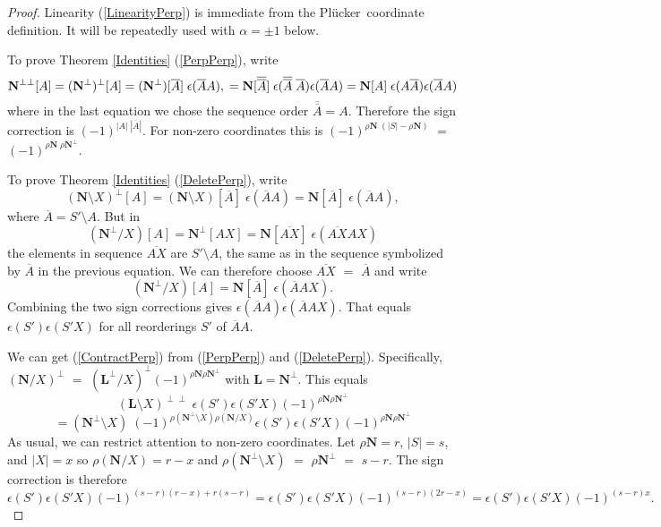 \documentclass[12pt]{article}
\theoremstyle{definition}
\newcommand{\scomp}[1]{\ensuremath{\overline{#1}}}
\newcommand{\Rank}{{\rho}}%
\newcommand{\Card}[1]{\ensuremath{{\left|#1\right|}}}
\newcommand{\ext}[1]{\ensuremath{\mathbf{#1}}}
\newcommand{\Plucker}{Pl\"{u}cker\ }
\begin{document}
\begin{proof}
Linearity (\ref{LinearityPerp}) is immediate from the \Plucker coordinate
definition.  It will be repeatedly used with $\alpha = \pm 1$ below.

To prove Theorem \ref{Identities} (\ref{PerpPerp}), write
\begin{equation*}
\ext{N}^{\perp\perp}[A] = (\ext{N}^\perp)^\perp[A] 
                  = (\ext{N}^\perp)[\scomp{A}]\;\epsilon(\scomp{A} A),\\
= \ext{N}[\scomp{\scomp{A}}]\;
\epsilon(\scomp{\scomp{A}}\;\scomp{A})\epsilon(\scomp{A} A)\\
= \ext{N}[A]\;
\epsilon(A\scomp{A})\epsilon(\scomp{A} A)
\end{equation*}
where in the last equation we chose the sequence order $\scomp{\scomp{A}}=A$.
Therefore the sign correction is 
$(-1)^{|A|\;|\scomp{A}|}$.
For 
non-zero coordinates this is 
$(-1)^{\rho\ext{N}\;(\Card{S}-\rho\ext{N})}$ $=$
$(-1)^{\rho\ext{N}\;\rho\ext{N}^\perp}$.

To prove Theorem \ref{Identities} (\ref{DeletePerp}), write
\begin{equation*}
(\ext{N}\setminus X)^\perp[A] = 
(\ext{N}\setminus X)[\scomp{A}]\;\epsilon(\scomp{A}A)=
                          \ext{N}[\scomp{A}]\;\epsilon(\scomp{A}A),
\end{equation*}
where $\scomp{A}=S'\setminus A$.  But in 
\begin{equation*}
(\ext{N}^\perp/X)[A] = \ext{N}^\perp[AX] = \ext{N}[\scomp{AX}]\;
                  \epsilon(\scomp{AX}AX)
\end{equation*}
the elements in sequence 
$\scomp{AX}$ 
are $S'\setminus A$, the
same as in the sequence symbolized by $\scomp{A}$ in the previous equation.
We can therefore choose $\scomp{AX}$ $=$ $\scomp{A}$ and write
\begin{equation*}
(\ext{N}^\perp/X)[A] = \ext{N}[\scomp{A}]\;
                  \epsilon(\scomp{A}AX).
\end{equation*}
Combining the two sign corrections gives 
$\epsilon(\scomp{A}A)\epsilon(\scomp{A}AX)$.  That equals
$\epsilon(S')\epsilon(S'X)$ for all reorderings
$S'$ of $\scomp{A}A$.

We can get (\ref{ContractPerp}) from (\ref{PerpPerp}) and (\ref{DeletePerp}).
Specifically, $(\ext{N}/X)^\perp$ $=$ 
$(\ext{L}^\perp/X)^\perp(-1)^{\Rank{\ext{N}}\Rank{\ext{N}^\perp}}$ with
$\ext{L}=\ext{N}^\perp$.  This equals
\[
(\ext{L}\setminus X)^{\perp\perp}\;
   \epsilon(S')\epsilon(S'X)(-1)^{\Rank{\ext{N}}\Rank{\ext{N}^\perp}}
\]
\[
= (\ext{N}^\perp\setminus X)\;
(-1)^{\rho(\ext{N}^\perp\setminus X)\rho(\ext{N}/X)}
   \epsilon(S')\epsilon(S'X)(-1)^{\Rank{\ext{N}}\Rank{\ext{N}^\perp}}
\]
As usual, we can restrict attention to non-zero coordinates.
Let $\rho \ext{N}=r$, $\Card{S}=s$, and $\Card{X}=x$ so $\rho(\ext{N}/X)=r-x$
and $\rho(\ext{N}^\perp\setminus X)$ $=$ $\rho\ext{N}^\perp$ $=$ $s-r$. The sign
correction is therefore
\[
   \epsilon(S')\epsilon(S'X)(-1)^{(s-r)(r-x)+r(s-r)}=
   \epsilon(S')\epsilon(S'X)(-1)^{(s-r)(2r-x)}=   
   \epsilon(S')\epsilon(S'X)(-1)^{(s-r)x}.
\]


\end{proof}
\end{document}
